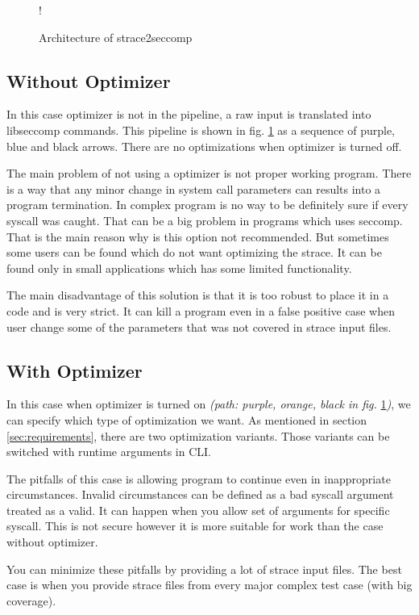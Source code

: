 \begin{figure}[h]
  \centering
  \resizebox {\textwidth} {!} {
    
  }
  \caption{Architecture of strace2seccomp}
  \label{fig:tikz:architecture}
\end{figure}

\subsection{Without Optimizer}
In this case optimizer is not in the pipeline, a raw input is translated into libseccomp commands.
This pipeline is shown in fig. \ref{fig:tikz:architecture} as a sequence of purple, blue and black arrows.
There are no optimizations when optimizer is turned off.

The main problem of not using a optimizer is not proper working program.
There is a way that any minor change in system call parameters can results into a program termination.
In complex program is no way to be definitely sure if every syscall was caught.
That can be a big problem in programs which uses seccomp.
That is the main reason why is this option not recommended.
But sometimes some users can be found which do not want optimizing the strace.
It can be found only in small applications which has some limited functionality.

The main disadvantage of this solution is that it is too robust to place it in a code and is very strict.
It can kill a program even in a false positive case when user change some of the parameters that was not covered in strace input files.

\subsection{With Optimizer}
In this case when optimizer is turned on \textit{(path: purple, orange, black in fig.} \ref{fig:tikz:architecture}\textit{)}, we can specify which type of optimization we want.
As mentioned in section \ref{sec:requirements}, there are two optimization variants.
Those variants can be switched with runtime arguments in CLI.

The pitfalls of this case is allowing program to continue even in inappropriate circumstances.
Invalid circumstances can be defined as a bad syscall argument treated as a valid.
It can happen when you allow set of arguments for specific syscall.
This is not secure however it is more suitable for work than the case without optimizer.

You can minimize these pitfalls by providing a lot of strace input files.
The best case is when you provide strace files from every major complex test case (with big coverage).


